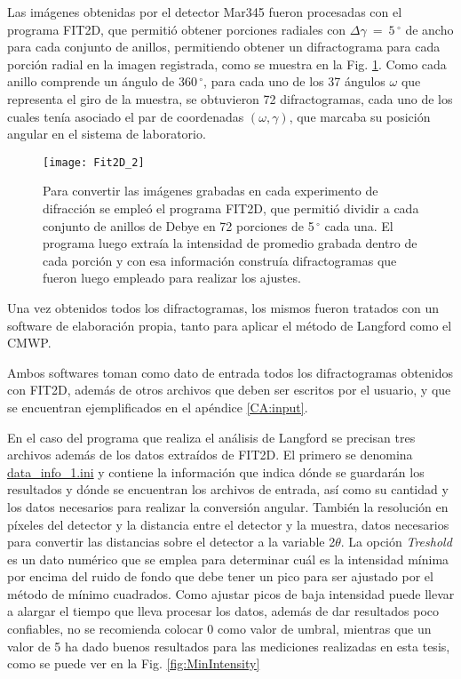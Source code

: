 Las imágenes obtenidas por el detector Mar345 fueron procesadas con el programa FIT2D\cite{FIT2D}, que permitió obtener porciones radiales con $\Delta \gamma \ = \ 5\,^{\circ}$ de ancho para cada conjunto de anillos, permitiendo obtener un difractograma para cada porción radial en la imagen registrada, como se muestra en la Fig. \ref{fig:fit2d}.
Como cada anillo comprende un ángulo de 360\,$^{\circ}$, para cada uno de los 37 ángulos $\omega$ que representa el giro de la muestra, se obtuvieron 72 difractogramas, cada uno de los cuales tenía asociado el par de coordenadas $(\omega, \gamma)$, que marcaba su posición angular en el sistema de laboratorio.

\begin{figure}[!htb] 
  \centering
  \texttt{[image: Fit2D\_2]}
  \caption{Para convertir las imágenes grabadas en cada experimento de difracción se empleó el programa FIT2D, que permitió dividir a cada conjunto de anillos de Debye en 72 porciones de 5\,$^{\circ}$ cada una. El programa luego extraía la intensidad de promedio grabada dentro de cada porción y con esa información construía difractogramas que fueron luego empleado para realizar los ajustes.}
  \label{fig:fit2d}
\end{figure}

Una vez obtenidos todos los difractogramas, los mismos fueron tratados con un software de elaboración propia, tanto para aplicar el método de Langford como el CMWP.

Ambos softwares toman como dato de entrada todos los difractogramas obtenidos con FIT2D, además de otros archivos que deben ser escritos por el usuario, y que se encuentran ejemplificados en el apéndice \ref{CA:input}.

En el caso del programa que realiza el análisis de Langford se precisan tres archivos además de los datos extraídos de FIT2D.
El primero se denomina \hyperlink{datainfo}{data\_info\_1.ini} y contiene la información que indica dónde se guardarán los resultados y dónde se encuentran los archivos de entrada, así como su cantidad y los datos necesarios para realizar la conversión angular.
También la resolución en píxeles del detector y la distancia entre el detector y la muestra, datos necesarios para convertir las distancias sobre el detector a la variable 2$\theta$.
La opción \textit{Treshold} es un dato numérico que se emplea para determinar cuál es la intensidad mínima por encima del ruido de fondo que debe tener un pico para ser ajustado por el método de mínimo cuadrados. 
Como ajustar picos de baja intensidad puede llevar a alargar el tiempo que lleva procesar los datos, además de dar resultados poco confiables, no se recomienda colocar 0 como valor de umbral, mientras que un valor de 5 ha dado buenos resultados para las mediciones realizadas en esta tesis, como se puede ver en la Fig. \ref{fig:MinIntensity}

